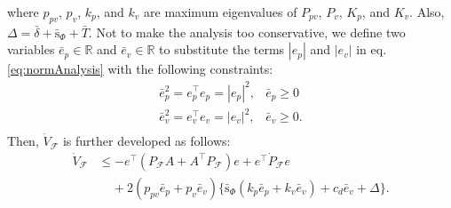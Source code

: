 \documentclass[letterpaper, 10 pt, conference]{ieeeconf}  %
\begin{document}
where $p_{pv}$, $p_v$, $k_p$, and $k_v$ are maximum eigenvalues of $P_{pv}$, $P_v$, $K_p$, and $K_v$.
Also, $\Delta = \bar{\delta}+\bar{\text{s}}_\Phi + \bar{T}$.
Not to make the analysis too conservative, 
we define two variables $\bar{e}_p\in\mathbb{R}$ and $\bar{e}_v\in\mathbb{R}$ to substitute the terms $|e_p|$ and $|e_v|$ in eq. \eqref{eq:normAnalysis} with the following constraints:
\begin{equation}
\begin{array}{ll}
\bar{e}_p^2 = e_p^\top e_p = |e_p|^2, & \bar{e}_p \geq 0 \\
\bar{e}_v^2 = e_v^\top e_v = |e_v|^2, & \bar{e}_v \geq 0. \\
\end{array} \nonumber 
\end{equation} 
Then, $\dot{V}_\mathcal{F}$ is further developed as follows:
\begin{align}
\dot{V}_\mathcal{F} &\leq -e^\top( P_\mathcal{F}A + A^\top P_\mathcal{F}) e + e^\top \dot{P}_\mathcal{F}e  \label{eq:aaa}\\
 &\;\;\;\;+2(p_{pv}\bar{e}_p+p_v\bar{e}_v)\{\bar{\text{s}}_\Phi(k_p\bar{e}_p+k_v\bar{e}_v) + c_d\bar{e}_v + \Delta\}. \nonumber 
\end{align}
\end{document}
